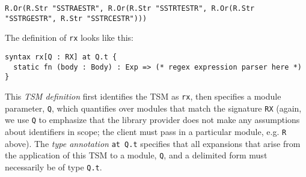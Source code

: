 \begin{lstlisting}[numbers=none]
R.Or(R.Str "SSTRAESTR", R.Or(R.Str "SSTRTESTR", R.Or(R.Str "SSTRGESTR", R.Str "SSTRCESTR")))
\end{lstlisting}

The definition of \lstinline{rx} looks like this:
\begin{lstlisting}[numbers=none]
syntax rx[Q : RX] at Q.t {
  static fn (body : Body) : Exp => (* regex expression parser here *)
}
\end{lstlisting}
This \emph{TSM definition} first identifies the TSM as \lstinline{rx}, then specifies a module parameter, \lstinline{Q}, which quantifies over modules that match the signature \lstinline{RX} (again, we use \lstinline{Q} to emphasize that the library provider does not make any assumptions about identifiers in scope; the client must pass in a particular module, e.g. \lstinline{R} above). The \emph{type annotation} \lstinline{at Q.t} specifies that all expansions that arise from the application of this TSM to a module, \lstinline{Q}, and a delimited form must necessarily be of type \lstinline{Q.t}. 

